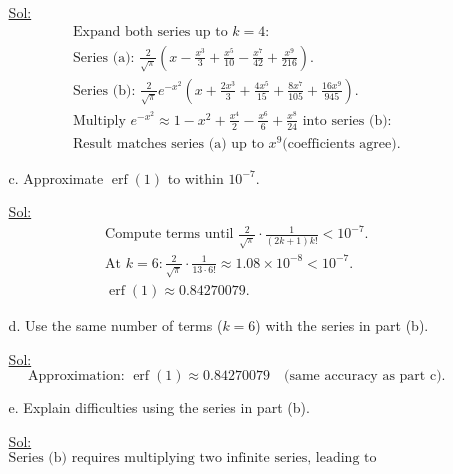 \begin{enumerate}
\begin{itemize}
      \underline{Sol:}\\
      \[
        \begin{array}{l}
          \textrm{Expand both series up to } k=4: \\
          \textrm{Series (a): } \frac{2}{\sqrt{\pi}} \left( x -
            \frac{x^3}{3} + \frac{x^5}{10} - \frac{x^7}{42} +
          \frac{x^9}{216} \right). \\
          \textrm{Series (b): } \frac{2}{\sqrt{\pi}} e^{-x^2} \left(
            x + \frac{2x^3}{3} + \frac{4x^5}{15} + \frac{8x^7}{105} +
          \frac{16x^9}{945} \right). \\
          \textrm{Multiply } e^{-x^2} \approx 1 - x^2 + \frac{x^4}{2}
          - \frac{x^6}{6} + \frac{x^8}{24} \textrm{ into series (b):} \\
          \textrm{Result matches series (a) up to } x^9 \textrm{
          (coefficients agree).}
        \end{array}
      \]
      \bigbreak

    \item[c.] Approximate \( \operatorname{erf}(1) \) to within \( 10^{-7} \).

      \underline{Sol:}\\
      \[
        \begin{array}{l}
          \textrm{Compute terms until } \frac{2}{\sqrt{\pi}} \cdot
          \frac{1}{(2k+1)k!} < 10^{-7}. \\
          \textrm{At } k=6: \frac{2}{\sqrt{\pi}} \cdot \frac{1}{13
          \cdot 6!} \approx 1.08 \times 10^{-8} < 10^{-7}. \\
          \operatorname{erf}(1) \approx 0.84270079.
        \end{array}
      \]
      \bigbreak

    \item[d.] Use the same number of terms (\( k=6 \)) with the
      series in part (b).

      \underline{Sol:}\\
      \[
        \textrm{Approximation: } \operatorname{erf}(1) \approx
        0.84270079 \quad \textrm{(same accuracy as part c).}
      \]
      \bigbreak

    \item[e.] Explain difficulties using the series in part (b).

      \underline{Sol:}\\
      \[
        \textrm{Series (b) requires multiplying two infinite series,
          leading to computational complexity and potential loss of
          precision due to alternating signs. Additionally, terms grow
        before decaying, causing numerical instability.}
      \]
      \bigbreak
  \end{itemize}


\end{enumerate}
